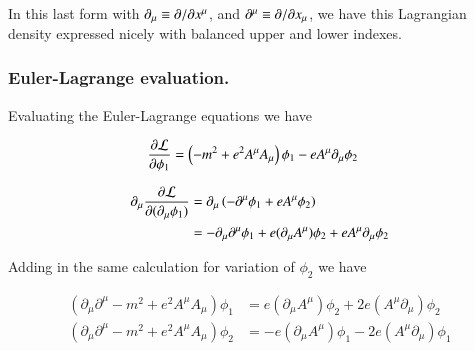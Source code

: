 In this last form with $\partial_\mu \equiv {\partial {}}/{\partial {x^\mu}}$, and $\partial^\mu \equiv {\partial {}}/{\partial {x_\mu}}$, we have this Lagrangian density expressed nicely with
balanced upper and lower indexes.

%


\subsubsection{Euler-Lagrange evaluation. }

Evaluating the Euler-Lagrange equations we have

\begin{align*}
\frac{\partial {\mathcal{L}}}{\partial {\phi_1}} &= \left( -m^2 + e^2 A^\mu A_\mu \right) \phi_1 - e A^\mu \partial_\mu \phi_2 
\end{align*}

\begin{align*}
\partial_\mu \frac{\partial {\mathcal{L}}}{\partial {(\partial_\mu \phi_1)}} 
&=
\partial_\mu \left( -\partial^\mu \phi_1 + e A^\mu \phi_2 \right) \\
&=
-\partial_\mu \partial^\mu \phi_1 
+ e (\partial_\mu A^\mu) \phi_2 
+ e A^\mu \partial_\mu \phi_2 
\\
\end{align*}

Adding in the same calculation for variation of $\phi_2$ we have

\begin{align*}
\left( \partial_\mu \partial^\mu -m^2 + e^2 A^\mu A_\mu \right) \phi_1 &= e (\partial_\mu A^\mu) \phi_2 + 2 e (A^\mu \partial_\mu) \phi_2  \\
\left( \partial_\mu \partial^\mu -m^2 + e^2 A^\mu A_\mu \right) \phi_2 &= -e (\partial_\mu A^\mu) \phi_1 - 2 e (A^\mu \partial_\mu) \phi_1 
\end{align*}

